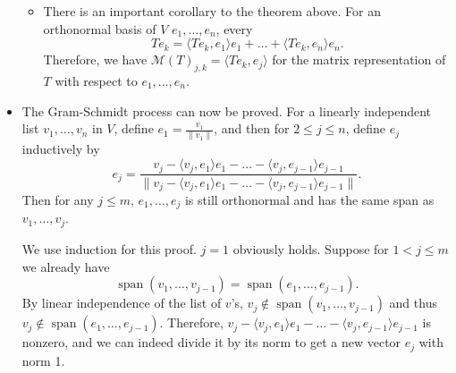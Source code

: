 \documentclass{article}
\newcommand{\s}{\operatorname{span}}
\newcommand{\inp}[2]{\langle #1, #2 \rangle}
\newcommand{\nm}[1]{\| #1 \|}
\newcommand{\M}{\mathcal{M}}
\begin{document}
\begin{itemize}
    \begin{itemize}
        \item There is an important corollary to the theorem above. For an orthonormal basis of $V$ $e_1,\dots,e_n$, every $$Te_k = \inp{Te_k}{e_1}e_1 + \dots + \inp{Te_k}{e_n}e_n.$$ Therefore, we have $\M(T)_{j,k} = \inp{Te_k}{e_j}$ for the matrix representation of $T$ with respect to $e_1,\dots,e_n$.
    \end{itemize}
    \item The Gram-Schmidt process can now be proved. For a linearly independent list $v_1,\dots,v_n$ in $V$, define $e_1 = \frac{v_1}{\nm{v_1}}$, and then for $2 \leq j \leq n$, define $e_j$ inductively by $$e_j = \frac{v_j - \inp{v_j}{e_1}e_1 - \dots - \inp{v_j}{e_{j-1}}e_{j-1}}{\nm{v_j - \inp{v_j}{e_1}e_1 - \dots - \inp{v_j}{e_{j-1}}e_{j-1}}}.$$ Then for any $j \leq m$, $e_1, \dots, e_j$ is still orthonormal and has the same span as $v_1,\dots,v_j$. 
    
    We use induction for this proof. $j = 1$ obviously holds. Suppose for $1 < j \leq m$ we already have $$\s(v_1,\dots,v_{j-1}) = \s(e_1,\dots,e_{j-1}).$$ By linear independence of the list of $v$'s, $v_j \notin \s(v_1,\dots,v_{j-1})$ and thus $v_j \notin \s(e_1,\dots,e_{j-1})$. Therefore, $v_j - \inp{v_j}{e_1}e_1 - \dots - \inp{v_j}{e_{j-1}}e_{j-1}$ is nonzero, and we can indeed divide it by its norm to get a new vector $e_j$ with norm 1.
    

\end{itemize}
\end{document}
